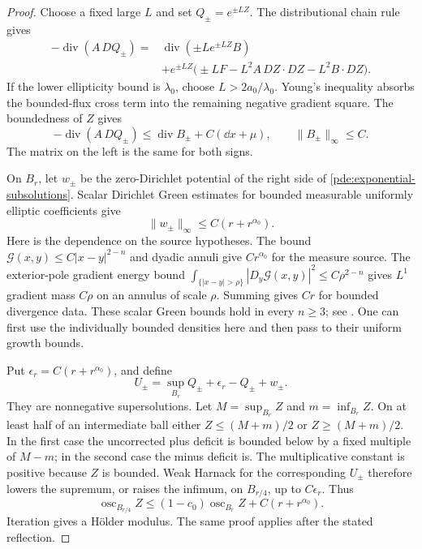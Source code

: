 \begin{proof}
Choose a fixed large \(L\) and set \(Q_\pm=e^{\pm LZ}\).
The distributional chain rule gives
\begin{align*}
 -\operatorname{div}(A\,DQ_\pm)
 ={}&\operatorname{div}(\pm Le^{\pm LZ}B)\\
 &+e^{\pm LZ}\big(\pm LF-L^2 A\,DZ\cdot DZ-L^2B\cdot DZ\big).
\end{align*}
If the lower ellipticity bound is \(\lambda_0\), choose
\(L>2a_0/\lambda_0\).  Young's inequality absorbs the bounded-flux
cross term into the remaining negative gradient square.
The boundedness of \(Z\) gives
\begin{equation}
 -\operatorname{div}(A\,DQ_\pm)
 \le\operatorname{div}B_\pm+C(\dd x+\mu),
 \qquad \|B_\pm\|_\infty\le C.
 \label{pde:exponential-subsolutions}
\end{equation}
The matrix on the left is the same for both signs.

On \(B_r\), let \(w_\pm\) be the zero-Dirichlet potential of the
right side of \eqref{pde:exponential-subsolutions}.  Scalar Dirichlet
Green estimates for bounded measurable uniformly elliptic coefficients
give
\begin{equation}
 \|w_\pm\|_\infty\le C(r+r^{\alpha_0}).
 \label{pde:green-potential}
\end{equation}
Here is the dependence on the source hypotheses.  The bound
\(\mathcal G(x,y)\le C|x-y|^{2-n}\) and dyadic annuli give
\(Cr^{\alpha_0}\) for the measure source.  The exterior-pole gradient
energy bound
\(\int_{\{|x-y|>\rho\}}|D_y\mathcal G(x,y)|^2
 \le C\rho^{2-n}\)
gives \(L^1\) gradient mass \(C\rho\) on an annulus of scale \(\rho\).
Summing gives \(Cr\) for bounded divergence data.
These scalar Green bounds hold in every \(n\ge3\);
see \cite[Corollary~4.1 and Theorem~3.6]{KangKim2010}.
One can first use the individually bounded densities here and then
pass to their uniform growth bounds.

Put \(\epsilon_r=C(r+r^{\alpha_0})\), and define
\[
 U_\pm=\sup_{B_r}Q_\pm+\epsilon_r-Q_\pm+w_\pm.
\]
They are nonnegative supersolutions.  Let \(M=\sup_{B_r}Z\) and
\(m=\inf_{B_r}Z\).  On at least half of an intermediate ball either
\(Z\le(M+m)/2\) or \(Z\ge(M+m)/2\).
In the first case the uncorrected plus deficit is bounded below by
a fixed multiple of \(M-m\); in the second case the minus deficit is.
The multiplicative constant is positive because \(Z\) is bounded.
Weak Harnack for the corresponding \(U_\pm\) therefore lowers the
supremum, or raises the infimum, on \(B_{r/4}\), up to \(C\epsilon_r\).
Thus
\[
 \operatorname{osc}_{B_{r/4}}Z
 \le(1-c_0)\operatorname{osc}_{B_r}Z+C(r+r^{\alpha_0}).
\]
Iteration gives a H\"older modulus.  The same proof applies after the
stated reflection.
\end{proof}

